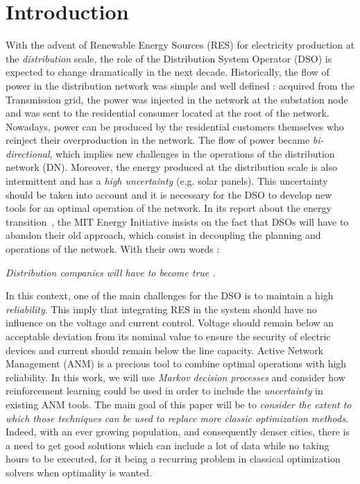 \section{Introduction}
\label{sec:intro}
With the advent of Renewable Energy Sources (RES) for electricity production at the \emph{distribution} scale, the role of the Distribution System Operator (DSO) is expected to change dramatically in the next decade. 
Historically, the flow of power in the distribution network was simple and well defined : acquired from the Transmission grid, the power was injected in the network at the substation node and was sent to the residential consumer located at the root of the network. 
Nowadays, power can be produced by the residential customers themselves who reinject their overproduction in the network.
The flow of power became \emph{bi-directional}, which implies new challenges in the operations of the distribution network (DN). 
Moreover, the energy produced at the distribution scale is also intermittent and has a \emph{high uncertainty}
(e.g. solar panels). 
This uncertainty should be taken into account and it is necessary for the DSO to develop new tools for an optimal operation of the network.
In its report about the energy transition~\cite{utility}, the MIT Energy Initiative insists on the fact that DSOs will have to abandon their old  approach, which consist in decoupling the planning and operations of the network. 
With their own words : 
\begin{displayquote}
\emph{Distribution companies will have to become true .}
\end{displayquote}

In this context, one of the main challenges for the DSO is to maintain a high \emph{reliability}. 
This imply that integrating RES in the system should have no influence on the voltage and current control. 
Voltage should remain below an acceptable deviation from its nominal value to ensure the security of electric devices and current should remain below the line capacity. 
Active Network Management (ANM) is a precious tool to combine optimal operations with high reliability. 
In this work, we will use \emph{Markov decision processes} and consider how
reinforcement learning could be used in order
to include the \emph{uncertainty} in existing ANM tools.
The main goal of this paper will be to \emph{consider the extent to which those techniques
can be used to replace more classic optimization methods}. 
Indeed, with an ever growing population, and consequently denser cities,
there is a need to get good solutions
which can include a lot of data while no taking hours to be executed,
for it being a recurring problem in classical optimization solvers when
optimality is wanted.

